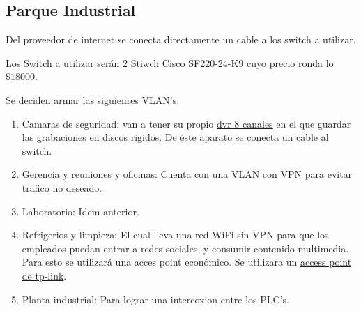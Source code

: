 \documentclass[11pt]{article}
\begin{document}
    \subsection{Parque Industrial}

        Del proveedor de internet se conecta directamente un cable a los switch a utilizar. 

        Los Switch a utilizar serán $2$ \href{https://articulo.mercadolibre.com.ar/MLA-714545399-switch-cisco-semi-admin-24-puertos-10100-2-giga-sf220-24-k9-_JM#position=34&type=item&tracking_id=4df4b6b4-1084-45cf-bab2-a07d312cf877}{Stiwch Cisco SF220-24-K9}
        cuyo precio ronda lo $\$18000$.


        Se deciden armar las siguienres VLAN's: 

        \begin{enumerate}
            \item Camaras de seguridad: van a tener su propio  
            \href{https://articulo.mercadolibre.com.ar/MLA-658975031-dvr-xvr-dahua-8ch-canales-hd-1080n-cooper-pentahibrido-p2p-_JM#reco_item_pos=0&reco_backend=machinalis-seller-items-pdp&reco_backend_type=low_level&reco_client=vip-seller_items-above&reco_id=5b1ef3a8-b109-48d2-8d27-f2781047b33d}{dvr 8 canales}
            en el que guardar las grabaciones en discos rigidos. De éste aparato se conecta un cable al switch.
            \item Gerencia y reuniones y oficinas: Cuenta con una VLAN con VPN para evitar trafico no deseado.
            \item Laboratorio: Idem anterior.
            \item Refrigerios y limpieza: El cual lleva una red WiFi sin VPN para que los empleados puedan entrar a redes sociales, y 
                consumir contenido multimedia. Para esto se utilizará una acces point económico.
                Se utilizara un 
                \href{https://www.mercadolibre.com.ar/access-point-router-tp-link-archer-c80-negro-1-unidad/p/MLA15904250?pdp_filters=category:MLA430901%7CCONNECTION_TYPE:279958#searchVariation=MLA15904250&position=2&type=product&tracking_id=d8d0e6d5-6d3c-4d79-9478-ce1d3aa1232d}{access point de tp-link}.
            \item Planta industrial: Para lograr una intercoxion entre los PLC's.
        \end{enumerate}
\end{document}
